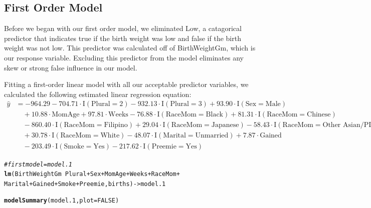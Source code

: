 \documentclass{article}\usepackage[]{graphicx}\usepackage[]{xcolor}
\makeatletter
\newcommand{\hlnum}[1]{\textcolor[rgb]{0.686,0.059,0.569}{#1}}%
\newcommand{\hlcom}[1]{\textcolor[rgb]{0.678,0.584,0.686}{\textit{#1}}}%
\newcommand{\hlopt}[1]{\textcolor[rgb]{0,0,0}{#1}}%
\newcommand{\hlstd}[1]{\textcolor[rgb]{0.345,0.345,0.345}{#1}}%
\newcommand{\hlkwb}[1]{\textcolor[rgb]{0.69,0.353,0.396}{#1}}%
\newcommand{\hlkwc}[1]{\textcolor[rgb]{0.333,0.667,0.333}{#1}}%
\newcommand{\hlkwd}[1]{\textcolor[rgb]{0.737,0.353,0.396}{\textbf{#1}}}%
\newenvironment{kframe}{%
 \def\at@end@of@kframe{}%
 \ifinner\ifhmode%
  \def\at@end@of@kframe{\end{minipage}}%
  \begin{minipage}{\columnwidth}%
 \fi\fi%
 \def\FrameCommand##1{\hskip\@totalleftmargin \hskip-\fboxsep
 \colorbox{shadecolor}{##1}\hskip-\fboxsep
     \hskip-\linewidth \hskip-\@totalleftmargin \hskip\columnwidth}%
 \MakeFramed {\advance\hsize-\width
   \@totalleftmargin\z@ \linewidth\hsize
   \@setminipage}}%
 {\par\unskip\endMakeFramed%
 \at@end@of@kframe}
\newenvironment{knitrout}{}{} %
\makeatother
\begin{document}
\subsection{First Order Model}
Before we began with our first order model, we eliminated Low, a catagorical predictor that indicates true if the birth weight was low and false if the birth weight was not low. This predictor was calculated off of BirthWeightGm, which is our response variable. Excluding this predictor from the model eliminates any skew or strong false influence in our model. 

Fitting a first-order linear model with all our acceptable predictor variables, we calculated the following estimated linear regression equation: \\

\begin{align*} \hat{y} &= -964.29 - 704.71\cdot \text{I}(\text{Plural} = 2) - 932.13\cdot \text{I}(\text{Plural} = 3) + 93.90\cdot \text{I}(\text{Sex} = \text{Male}) \\ &\quad + 10.88\cdot \text{MomAge} + 97.81\cdot \text{Weeks} -76.88\cdot \text{I}(\text{RaceMom} = \text{Black}) + 81.31\cdot \text{I}(\text{RaceMom} = \text{Chinese}) \\ &\quad -860.40\cdot \text{I}(\text{RaceMom} = \text{Filipino}) + 29.04\cdot \text{I}(\text{RaceMom} = \text{Japanese}) -58.43\cdot \text{I}(\text{RaceMom} = \text{Other\ Asian/PI}) \\ &\quad + 30.78\cdot \text{I}(\text{RaceMom} = \text{White}) -48.07\cdot \text{I}(\text{Marital} = \text{Unmarried}) + 7.87\cdot \text{Gained} \\ &\quad -203.49\cdot \text{I}(\text{Smoke} = \text{Yes}) -217.62\cdot \text{I}(\text{Preemie} = \text{Yes}) \end{align*}

  
\begin{knitrout}
\color{fgcolor}\begin{kframe}
\begin{alltt}
\hlcom{#first model = model.1}
\hlkwd{lm}\hlstd{(BirthWeightGm} \hlopt{~} \hlstd{Plural} \hlopt{+} \hlstd{Sex} \hlopt{+} \hlstd{MomAge} \hlopt{+} \hlstd{Weeks} \hlopt{+} \hlstd{RaceMom} \hlopt{+}
     \hlstd{Marital} \hlopt{+} \hlstd{Gained} \hlopt{+} \hlstd{Smoke} \hlopt{+} \hlstd{Preemie, births)} \hlkwb{->} \hlstd{model.1}

\hlkwd{modelSummary}\hlstd{(model.1,} \hlkwc{plot}\hlstd{=}\hlnum{FALSE}\hlstd{)}
\end{alltt}
\end{kframe}
\end{knitrout}
  
\end{document}
